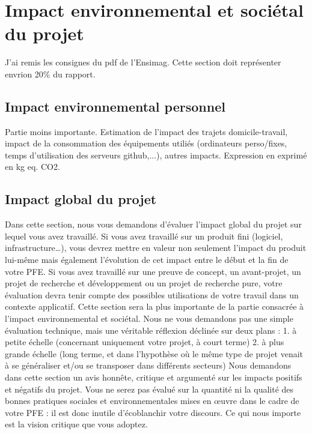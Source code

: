\documentclass[12pt]{article}
\begin{document}
\section{Impact environnemental et sociétal du projet}
J'ai remis les consignes du pdf de l'Ensimag. Cette section doit représenter envrion 20\% du rapport.
\subsection{Impact environnemental personnel}
Partie moins importante.
Estimation de l'impact des trajets domicile-travail, impact de la consommation des équipements utiliés (ordinateurs perso/fixes, temps d'utilisation des serveurs github,...), autres impacts.
Expression en exprimé en kg eq. CO2.

\subsection{Impact global du projet}
Dans cette section, nous vous demandons d’évaluer l’impact global du projet sur lequel vous avez travaillé. Si vous avez travaillé sur un produit fini (logiciel, infrastructure…), vous devrez mettre en valeur non seulement l’impact du produit lui-même mais également l’évolution de cet impact entre le début et la fin de votre PFE. Si vous avez travaillé sur une preuve de concept, un avant-projet, un projet de recherche et développement ou un projet de recherche pure, votre évaluation devra tenir compte des possibles utilisations de votre travail dans un contexte applicatif. Cette section sera la plus importante de la partie consacrée à l’impact environnemental et sociétal. Nous ne vous demandons pas une simple évaluation technique, mais une véritable réflexion déclinée sur deux plans :
1. à petite échelle (concernant uniquement votre projet, à court terme)
2. à plus grande échelle (long terme, et dans l’hypothèse où le même type de projet venait à se généraliser et/ou
se transposer dans différents secteurs)
Nous demandons dans cette section un avis honnête, critique et argumenté sur les impacts positifs et négatifs du projet. Vous ne serez pas évalué sur la quantité ni la qualité des bonnes pratiques sociales et environnementales mises en œuvre dans le cadre de votre PFE : il est donc inutile d’écoblanchir votre discours. Ce qui nous importe est la vision critique que vous adoptez.
\end{document}
